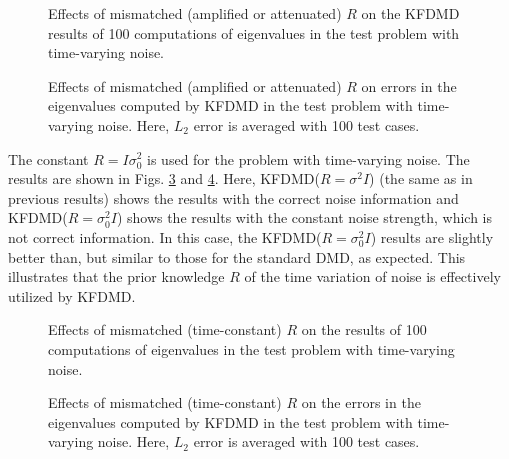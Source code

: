 \documentclass[aip,graphicx]{revtex4-1}
\begin{document}
\begin{figure}
	
    \caption{Effects of mismatched (amplified or attenuated) $R$ on the KFDMD results of 100 computations of eigenvalues in the test problem with time-varying noise.}	
	\label{fig:mis_eigen}
\end{figure}


\begin{figure}
	   \caption{Effects of mismatched (amplified or attenuated) $R$ on errors in the eigenvalues computed by KFDMD in the test problem with time-varying noise. Here, $L_2$ error is averaged with 100 test cases. }	
	\label{fig:mis_eigenerror}
\end{figure}

The constant $R=I\sigma_0^2$ is used for the problem with time-varying noise. The results are shown in Figs. \ref{fig:mis2_eigen} and \ref{fig:mis2_eigenerror}. Here, KFDMD($R=\sigma^2 I$) (the same as in previous results) shows the results with the correct noise information and KFDMD($R=\sigma^2_0 I$) shows the results with the constant noise strength, which is not correct information.  In this case, the KFDMD($R=\sigma_0^2 I$) results are slightly better than, but similar to those for the standard DMD, as expected.  This illustrates that the prior knowledge $R$ of the time variation of noise is effectively utilized by KFDMD. 

\begin{figure}
    \caption{Effects of mismatched (time-constant) $R$  on the results of 100 computations of eigenvalues in the test problem with time-varying noise.}	
	\label{fig:mis2_eigen}
\end{figure}


\begin{figure}
	   \caption{Effects of mismatched (time-constant) $R$  on the errors in the eigenvalues computed by KFDMD in the test problem with time-varying noise. Here, $L_2$ error is averaged with 100 test cases. }	
	\label{fig:mis2_eigenerror}
\end{figure}
\end{document}
